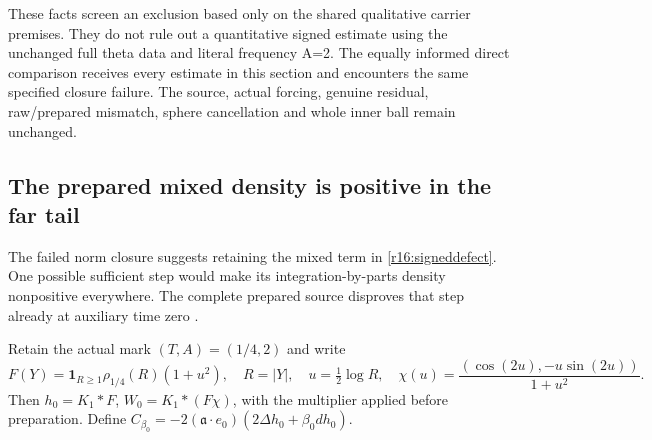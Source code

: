 \documentclass[11pt]{article}
\numberwithin{equation}{section}
\begin{document}
These facts screen an exclusion based only on the shared qualitative
carrier premises. They do not rule out a quantitative signed estimate
using the unchanged full theta data and literal frequency A=2.
The equally informed direct comparison receives every estimate in this
section and encounters the same specified closure failure. The source,
actual forcing, genuine residual, raw/prepared mismatch, sphere
cancellation and whole inner ball remain unchanged.


\subsection{The prepared mixed density is positive in the far tail}
\label{r17:preparedtail}

The failed norm closure suggests retaining the mixed term in
\eqref{r16:signeddefect}. One possible sufficient step would make
its integration-by-parts density nonpositive everywhere. The complete
prepared source disproves that step already at auxiliary time zero
\cite{PreparedTailNote}.

Retain the actual mark $(T,A)=(1/4,2)$ and write
\[
 F(Y)=\mathbf1_{R\ge1}\rho_{1/4}(R)(1+u^2),\quad
 R=|Y|,\quad u=\tfrac12\log R,\quad
 \chi(u)=\frac{(\cos(2u),-u\sin(2u))}{1+u^2}.
\]
Then $h_0=K_1*F$, $W_0=K_1*(F\chi)$, with the multiplier applied
before preparation. Define
$C_{\beta_0}=-2(\mathfrak a\cdot e_0)(2\Delta h_0+\beta_0dh_0)$.
\end{document}
